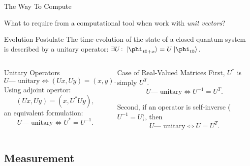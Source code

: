 \documentclass[
handout,
ignorenonframetext,hyperref={pdftex,unicode},xcolor=dvipsnames]{beamer}
\begin{document}
\begin{frame}{The Way To Compute}

  What to require from a computational tool when work with \emph{unit vectors}?

  \pause

  \begin{block}{Evolution Postulate}
    The time-evolution of the state of a closed quantum system is described
    by a \alert{unitary operator}: 
    $\exists U\colon  \ket{\phi_{t0+x}} = U \ket{\phi_{t0}}$.
  \end{block}
  
  \pause
  
  \begin{columns}
  \column{5.4cm}

    \begin{block}{Unitary Operators}
      \vspace{-4mm}
      \[
        U \text{— unitary} \Leftrightarrow (Ux,Uy) = (x,y).
      \]
      \pause
      Using adjoint opertor:
      \[
        (Ux,Uy) = (x,U^*Uy),
      \]
      an equivalent formulation:
      \[
        U \text{— unitary} \Leftrightarrow U^*=U^{-1}.
      \]

    \end{block}


  \column{5.4cm} \pause  
  
    \begin{block}{Case of Real-Valued Matrices}
    First, $U^*$ is simply $U^T$. 
      \[
        U \text{— unitary} \Leftrightarrow U^{-1}=U^T.
      \]
    
    Second, if an operator is self-inverse ($U^{-1}=U$), then 
      \[
        U \text{— unitary} \Leftrightarrow U=U^T.
      \]
    \end{block}
  
  \end{columns}
  
\end{frame}

\subsection{Measurement}
\end{document}
